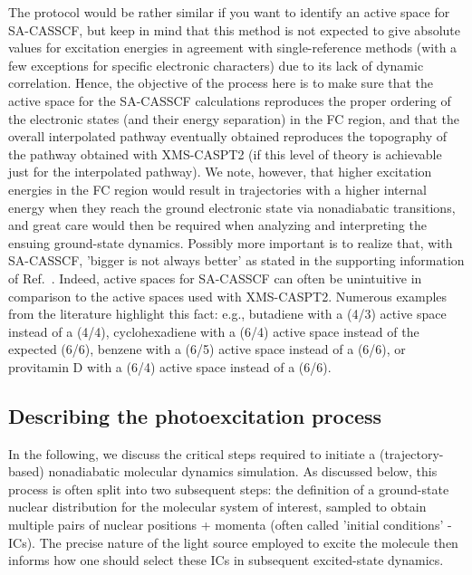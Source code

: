 \documentclass[9pt,bestpractices]{livecoms}
\begin{document}
The protocol would be rather similar if you want to identify an active space for SA-CASSCF, but keep in mind that this method is not expected to give absolute values for excitation energies in agreement with single-reference methods (with a few exceptions for specific electronic characters) due to its lack of dynamic correlation. Hence, the objective of the process here is to make sure that the active space for the SA-CASSCF calculations reproduces the proper ordering of the electronic states (and their energy separation) in the FC region, and that the overall interpolated pathway eventually obtained reproduces the topography of the pathway obtained with XMS-CASPT2 (if this level of theory is achievable just for the interpolated pathway). We note, however, that higher excitation energies in the FC region would result in trajectories with a higher internal energy when they reach the ground electronic state via nonadiabatic transitions, and great care would then be required when analyzing and interpreting the ensuing ground-state dynamics. Possibly more important is to realize that, with SA-CASSCF, 'bigger is not always better' as stated in the supporting information of Ref.~. Indeed, active spaces for SA-CASSCF can often be unintuitive in comparison to the active spaces used with XMS-CASPT2. Numerous examples from the literature highlight this fact: e.g., butadiene\cite{levine2009} with a (4/3) active space instead of a (4/4), cyclohexadiene\cite{tao2011first} with a (6/4) active space instead of the expected (6/6), benzene\cite{thompson2011} with a (6/5) active space instead of a (6/6), or provitamin D\cite{snyder2016gpu} with a (6/4) active space instead of a (6/6).

\subsection{Describing the photoexcitation process}
\label{sec:initconds}

In the following, we discuss the critical steps required to initiate a (trajectory-based) nonadiabatic molecular dynamics simulation. As discussed below, this process is often split into two subsequent steps: the definition of a ground-state nuclear distribution for the molecular system of interest, sampled to obtain multiple pairs of nuclear positions + momenta (often called 'initial conditions' - ICs). The precise nature of the light source employed to excite the molecule then informs how one should select these ICs in subsequent excited-state dynamics.
\end{document}
